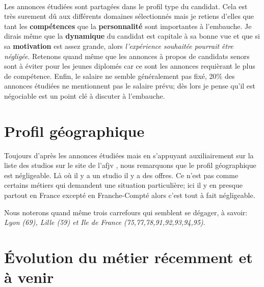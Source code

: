 \documentclass[12pt, a4paper]{report} %
\begin{document}
\paragraph{}
Les annonces étudiées sont partagées dans le profil type du candidat. Cela est très surement dû aux différents domaines sélectionnés mais je retiens d'elles que tant les \textbf{compétences} que la \textbf{personnalité} sont importantes à l'embauche. Je dirais même que la \textbf{dynamique} du candidat est capitale à sa bonne vue et que si sa \textbf{motivation} est assez grande, alors \emph{l'expérience souhaitée pourrait être négligée}. Retenons quand même que les annonces à propos de candidats senors sont à éviter pour les jeunes diplomés car ce sont les annonces requièrant le plus de compétence. Enfin, le salaire ne semble généralement pas fixé, 20\%{} des annonces étudiées  ne mentionnent pas le salaire prévu; dès lors je pense qu'il est négociable est un point clé à discuter à l'embauche.

\section{Profil géographique}
Toujours d'après les annonces étudiées mais en s'appuyant auxiliairement sur la liste des studios sur le site de l'\acrshort{afjv} \cite{afjvls}, nous remarquons que le profil géographique est négligeable. Là où il y a un studio il y a des offres. Ce n'est pas comme certains métiers  qui demandent une situation particulière; ici il y en presque partout en France excepté en Franche-Compté  alors c'est tout à fait négligeable.

Nous noterons quand même trois carrefours qui semblent se dégager, à savoir: \emph{Lyon (69), Lille (59) et  Ile de France (75,77,78,91,92,93,94,95)}. 

\section{Évolution du métier récemment et à venir}
\end{document}
